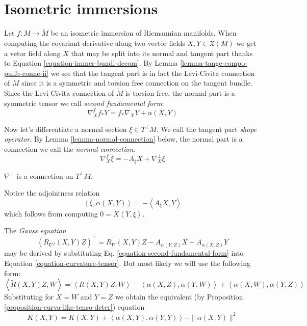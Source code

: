 \section{Isometric immersions}
\label{section-isometric-immersions}

Let $f:M \to \tilde{M}$ be an isometric
immersion of Riemannian manifolds. When
computing the covariant derivative along two
vector fields
$X,Y \in\mathfrak{X}(M)$ we get a vetor field
along $X$ that may be split into
its normal and tangent part thanks to
Equation
\ref{equation-immer-bundl-decom}. By Lemma
\ref{lemma-tange-compo-pullb-conne-ii} we see
that the
 tangent part is
in fact the Levi-Civita connection of $M$
since it is a symmetric and torsion
free connection on the tangent bundle. Since
the Levi-Civita connection of
$\tilde{M}$ is torsion free, the normal part
is a
symmetric tensor we call {\it second
fundamental form}:
\begin{equation}
\label{equation-second-fundamental-form}
\nabla^{f}_X f_*Y=f_*\nabla_XY+\alpha(X,Y)
\end{equation}

\medskip\noindent

Now let's differentiate a normal section
$\xi\in T^\perp M$.
We call the tangent part {\it shape
operator}. By Lemma
\ref{lemma-normal-connection} below, the
normal part is a connection
we call the {\it normal connection}.
\begin{equation}
\label{equation-shape-operator}
\nabla^f_X\xi=-A_\xi X+\nabla^\perp_X\xi
\end{equation}
\begin{lemma}
\label{lemma-normal-connection}
$\nabla^\perp$ is a connection on $T^\perp
M$.
\end{lemma}
Notice the adjointness relation
\begin{equation}
\label{equation-secon-funda-form-shape}
\left\langle{}\xi,\alpha(X,Y)\right\rangle{}=-\left\langle{}A_\xi
X,Y\right\rangle{}
\end{equation}
which follows from computing
$0=X\left\langle{}Y,\xi\right\rangle{}$.

The {\it Gauss equation}
$$
(R_{\nabla^f}(X,Y)Z)^\top=R_\nabla(X,Y)Z-
A_{\alpha(Y,Z)}X+A_{\alpha(X,Z)}Y
$$
may be derived by substituting Eq.
\ref{equation-second-fundamental-form}
into Equation
\ref{equation-curvature-tensor}. But most
likely we will use the
following form:
\begin{equation}
\label{equation-Gauss}
\left\langle{}\tilde{R}(X,Y)Z,W\right\rangle{}=\left\langle{}R(X,Y)Z,
W\right\rangle{}
-\left\langle{}\alpha(X,Z),\alpha(Y,W)\right\rangle{}+
\left\langle{}\alpha(X,W),\alpha(Y,Z)\right\rangle{}
\end{equation}
Substituting for $X=W$ and $Y=Z$ we obtain
the equivalent (by Proposition
\ref{proposition-curva-like-tenso-deter})
equation
\begin{equation}
\label{equation-Gauss-sectional-curvature}
K(X,Y)=\tilde{K}(X,Y)+\left\langle{}\alpha(X,Y),
\alpha(Y,Y)\right\rangle{}-\|\alpha(X,Y)\|^2
\end{equation}

